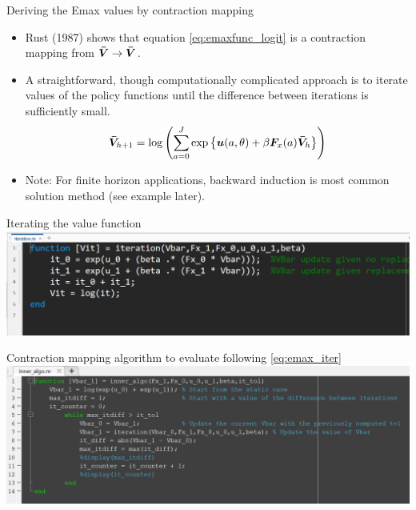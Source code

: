 \documentclass[aspectratio=169]{beamer}
\begin{document}
	\begin{frame}{Deriving the Emax values by contraction mapping}
		\begin{itemize}
			\itemsep1em
			\item Rust (1987) shows that equation \ref{eq:emaxfunc_logit} is a contraction mapping from $\bm{\Bar{V}} \rightarrow \bm{\Bar{V}}$.
			\item A straightforward, though computationally complicated approach is to iterate values of the policy functions until the difference between iterations is sufficiently small.
			\begin{equation}\label{eq:emax_iter}
				\bm{\Bar{V}}_{h+1} = \log \left(\sum_{a=0}^J \exp \left\{ \bm{u}(a,\theta) + \beta \bm{F}_x(a) \bm{\Bar{V}}_h \right\} \right)
			\end{equation}
			\item Note: For finite horizon applications, backward induction is most common solution method (see example later).
		\end{itemize}
	\end{frame}
	
	
	\begin{frame}{Iterating the value function}
		\includegraphics[width=\textwidth]{figs/3_iteration.PNG}
	\end{frame}
	
	
	
	\begin{frame}{Contraction mapping algorithm to evaluate following \ref{eq:emax_iter}}
		\includegraphics[width=\textwidth]{figs/3_inneralgo.PNG}
	\end{frame}
	
\end{document}
